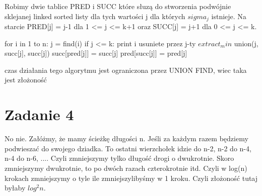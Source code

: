 \documentclass[12pt]{article}
\begin{document}
Robimy dwie tablice PRED i SUCC które słuzą do stworzenia podwójnie sklejanej linked sorted listy dla tych wartości j dla których $sigma_j$ istnieje. 
Na starcie PRED[j] = j-1 dla 1 <= j <= k+1 oraz SUCC[j] = j+1 dla 0 <= j <= k.


for i in 1 to n:
 j = find(i)
 if j <= k:
    print i usuniete przez j-ty $extract_min$ 
    union(j, succ[j], succ[j])
    succ[pred[j]] = succ[j]
    pred[succ[j]] = pred[j]

czas działania tego algorytmu jest ograniczona przez UNION FIND, wiec taka jest złożoność




\section{Zadanie 4}
No nie. Załóżmy, że mamy ścieżkę długości n. Jeśli za każdym razem będziemy podwieszać do swojego dziadka. To ostatni wierzchołek idzie do n-2, n-2 do n-4, n-4 do n-6, .... Czyli zmniejszymy tylko długość drogi o dwukrotnie. Skoro zmniejszymy dwukrotnie, to po dwóch razach czterokrotnie itd. Czyli w log(n) krokach zmniejszymy o tyle ile zmniejszylibyśmy w 1 kroku. Czyli złożoność tutaj byłaby $log^2n$.

\egroup
\end{document}
